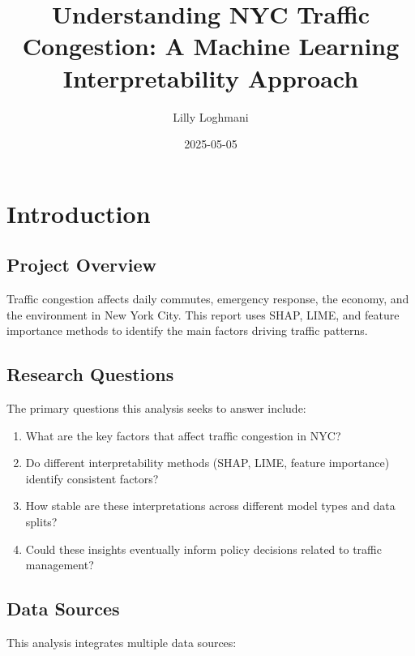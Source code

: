 \documentclass[
  letterpaper,
  DIV=11,
  numbers=noendperiod]{scrreprt}
\title{Understanding NYC Traffic Congestion: A Machine Learning
Interpretability Approach}
\author{Lilly Loghmani}
\date{2025-05-05}
\providecommand{\tightlist}{%
  \setlength{\itemsep}{0pt}\setlength{\parskip}{0pt}}\usepackage{longtable,booktabs,array}
\renewcommand*\contentsname{Table of contents}
\newcommand\contentsname{Table of contents}
\begin{document}
\maketitle

\renewcommand*\contentsname{Table of contents}
{
\hypersetup{linkcolor=}
\setcounter{tocdepth}{2}
\tableofcontents
}

\chapter{Introduction}\label{introduction}

\section{Project Overview}\label{project-overview}

Traffic congestion affects daily commutes, emergency response, the
economy, and the environment in New York City. This report uses SHAP,
LIME, and feature importance methods to identify the main factors
driving traffic patterns.

\section{Research Questions}\label{research-questions}

The primary questions this analysis seeks to answer include:

\begin{enumerate}
\def\labelenumi{\arabic{enumi}.}
\tightlist
\item
  What are the key factors that affect traffic congestion in NYC?
\item
  Do different interpretability methods (SHAP, LIME, feature importance)
  identify consistent factors?
\item
  How stable are these interpretations across different model types and
  data splits?
\item
  Could these insights eventually inform policy decisions related to
  traffic management?
\end{enumerate}

\section{Data Sources}\label{data-sources}

This analysis integrates multiple data sources:
\end{document}
